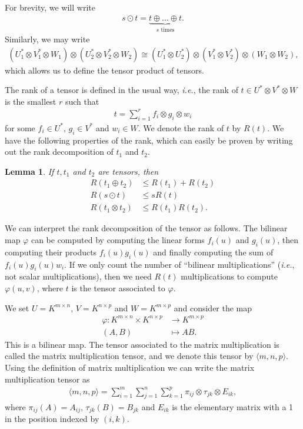 \documentclass{article}
\theoremstyle{plain}
\newtheorem{lemma}{Lemma}
\theoremstyle{definition}
\theoremstyle{remark}
\begin{document}
For brevity, we will write
\begin{align*}
    s \odot t = \underbrace{t \oplus \dots \oplus t}_\text{$s$ times}.
\end{align*}
Similarly, we may write
\begin{align*}
    (U_1^* \otimes V_1^* \otimes W_1) \otimes (U_2^* \otimes V_2^* \otimes W_2) \cong (U_1^* \otimes U_2^*) \otimes (V_1^* \otimes V_2^*) \otimes (W_1 \otimes W_2),
\end{align*}
which allows us to define the tensor product of tensors.

The rank of a tensor is defined in the usual way, \emph{i.e.}, the rank of $t \in U^* \otimes V^* \otimes W$ is the smallest $r$ such that
\begin{align*}
    t = \sum_{i=1}^r f_i \otimes g_i \otimes w_i
\end{align*}
for some $f_i \in U^*$, $g_i \in V^*$ and $w_i \in W$. We denote the rank of $t$ by $R(t)$. We have the following properties of the rank, which can easily be proven by writing out the rank decomposition of $t_1$ and $t_2$.

\begin{lemma}\label{lem:rank_properties}
If $t, t_1$ and $t_2$ are tensors, then
\begin{align*}
    R(t_1 \oplus t_2) &\leq R(t_1) + R(t_2) \\
    R(s \odot t) &\leq sR(t) \\
    R(t_1 \otimes t_2) &\leq R(t_1)R(t_2).
\end{align*}
\end{lemma}

We can interpret the rank decomposition of the tensor as follows. The bilinear map $\varphi$ can be computed by computing the linear forms $f_i(u)$ and $g_i(u)$, then computing their products $f_i(u)g_i(u)$ and finally computing the sum of $f_i(u)g_i(u)w_i$. If we only count the number of ``bilinear multiplications'' (\emph{i.e.}, not scalar multiplications), then we need $R(t)$ multiplications to compute $\varphi(u, v)$, where $t$ is the tensor associated to $\varphi$.

We set $U = K^{m \times n}$, $V = K^{n \times p}$ and $W = K^{m \times p}$ and consider the map
\begin{align*}
    \varphi \colon K^{m \times n} \times K^{n \times p} &\to K^{m \times p} \\
    (A, B) &\mapsto AB.
\end{align*}
This is a bilinear map. The tensor associated to the matrix multiplication is called the matrix multiplication tensor, and we denote this tensor by $\langle m, n, p \rangle$. Using the definition of matrix multiplication we can write the matrix multiplication tensor as
\begin{align*}
    \langle m, n, p \rangle = \sum_{i=1}^m \sum_{j=1}^n \sum_{k=1}^p \pi_{ij} \otimes \tau_{jk} \otimes E_{ik},
\end{align*}
where $\pi_{ij}(A) = A_{ij}$, $\tau_{jk}(B) = B_{jk}$ and $E_{ik}$ is the elementary matrix with a 1 in the position indexed by $(i, k)$.
\end{document}
